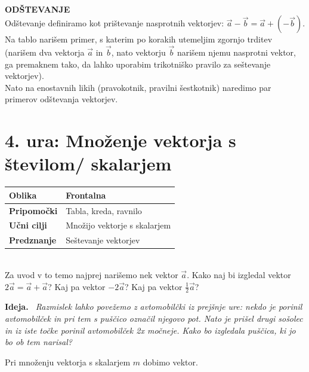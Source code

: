\documentclass[a4paper,11pt]{article}
\newenvironment{ide}{%
  \par\medskip\noindent\textbf{Ideja.}\itshape\ }{\par\medskip}
\begin{document}
\\
\textbf{ODŠTEVANJE}\\
Odštevanje definiramo kot prištevanje nasprotnih vektorjev: $\vec{a}-\vec{b}=\vec{a}+(-\vec{b})$.\\
Na tablo narišem primer, s katerim po korakih utemeljim zgornjo trditev (narišem dva vektorja $\vec{a}$ in $\vec{b}$, nato vektorju $\vec{b}$ narišem njemu nasprotni vektor, ga premaknem tako, da lahko uporabim trikotniško pravilo za seštevanje vektorjev).\\
Nato na enostavnih likih (pravokotnik, pravilni šestkotnik) naredimo par primerov odštevanja vektorjev.\\


\newpage \section{4. ura: Množenje vektorja s številom/ skalarjem}
\begin{tabularx}{\textwidth}{|>{\bfseries\RaggedRight}p{2.7cm}|X|}
\hline
Oblika & Frontalna \\ \hline
Pripomočki & Tabla, kreda, ravnilo \\ \hline
Učni cilji & Množijo vektorje s skalarjem \\ \hline
Predznanje & Seštevanje vektorjev \\ \hline

\end{tabularx}
\\

Za uvod v  to temo najprej narišemo nek vektor $\vec{a}$. Kako naj bi izgledal vektor $2\vec{a}=\vec{a}+\vec{a}$?  Kaj pa vektor $-2\vec{a}$? Kaj pa vektor $\frac{1}{2}\vec{a}$?\\
\begin{ide}
    Razmislek lahko povežemo z avtomobilčki iz prejšnje ure: nekdo je porinil avtomobilček in pri tem s puščico označil njegovo pot. Nato je prišel drugi sošolec in iz iste točke porinil avtomobilček 2x močneje. Kako bo izgledala puščica, ki jo bo ob tem narisal?
\end{ide}
Pri množenju vektorja s skalarjem $m$ dobimo vektor.\\
\end{document}

